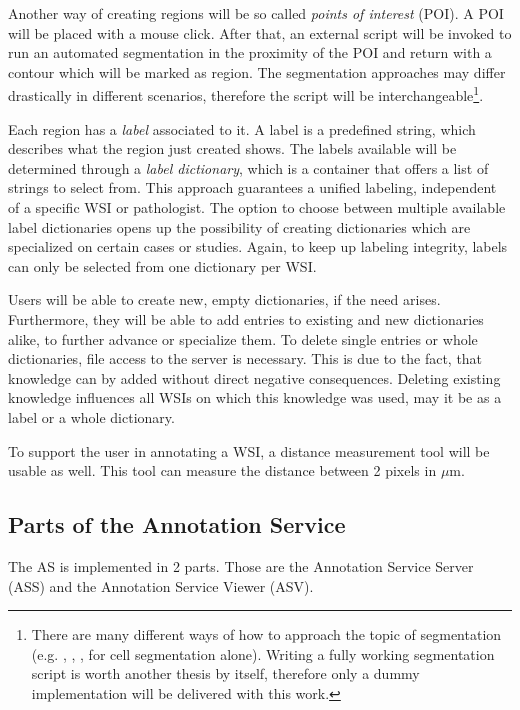 Another way of creating regions will be so called \emph{points of interest} (POI). A POI will be placed with a mouse click. After that, an external script will be invoked to run an automated segmentation in the proximity of the POI and return with a contour which will be marked as region. The segmentation approaches may differ drastically in different scenarios\cite{Liu12}, therefore the script will be interchangeable\footnote{There are many different ways of how to approach the topic of segmentation (e.g. \cite{Qi12}, \cite{Sharma16}, \cite{Wienert12}, \cite{Angulo10} for cell segmentation alone). Writing a fully working segmentation script is worth another thesis by itself, therefore only a dummy implementation will be delivered with this work.}.

Each region has a \emph{label} associated to it. A label is a predefined string, which describes what the region just created shows. The labels available will be determined through a \emph{label dictionary}, which is a container that offers a list of strings to select from. This approach guarantees a unified labeling, independent of a specific WSI or pathologist. The option to choose between multiple available label dictionaries opens up the possibility of creating dictionaries which are specialized on certain cases or studies. Again, to keep up labeling integrity, labels can only be selected from one dictionary per WSI.

Users will be able to create new, empty dictionaries, if the need arises. Furthermore, they will be able to add entries to existing and new dictionaries alike, to further advance or specialize them. To delete single entries or whole dictionaries, file access to the server is necessary. This is due to the fact, that knowledge can by added without direct negative consequences. Deleting existing knowledge influences all WSIs on which this knowledge was used, may it be as a label or a whole dictionary.

To support the user in annotating a WSI, a distance measurement tool will be usable as well. This tool can measure the distance between 2 pixels in $\mu$m.


\subsection{Parts of the Annotation Service}
The AS is implemented in 2 parts. Those are the Annotation Service Server (ASS) and the Annotation Service Viewer (ASV).

